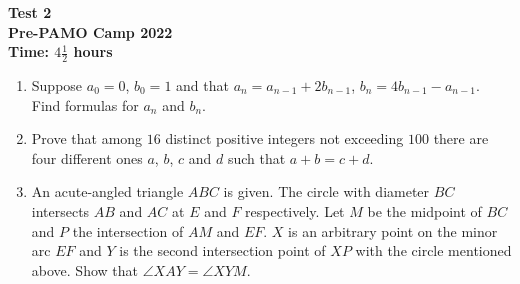 \documentclass{article}
\begin{document}
	\thispagestyle{empty}
	
	\begin{center}
		\textbf{\Large Test 2}
		\\ \vspace{1em}
		\textbf{\large Pre-PAMO Camp 2022}
		\\ \vspace{1em}
		\textbf{\large Time: $4\frac{1}{2}$ hours}
	\end{center}
	
	\vspace{24pt}
	
	\begin{enumerate}[itemsep=12pt]
		
		\item 
		Suppose $a_0 = 0$, $b_0 = 1$ and that $a_n = a_{n-1} + 2b_{n-1}$, $b_n =    4b_{n-1} -a_{n-1}$. Find formulas for $a_n$ and $b_n$.
	
		\item %
		Prove that among $16$ distinct positive integers not exceeding $100$ there are four different ones $a$, $b$, $c$ and $d$ such that $a+b = c+d$.
		
		\item %
		An acute-angled triangle $ABC$ is given. The circle with diameter $BC$ intersects $AB$ and $AC$ at $E$ and $F$ respectively. Let $M$ be the midpoint of $BC$ and $P$ the intersection of $AM$ and $EF$. $X$ is an arbitrary point on the minor arc $EF$ and $Y$ is the second intersection point of $XP$ with the circle mentioned above. Show that $\angle XAY = \angle XYM$.
		
	\end{enumerate}
	
\end{document}
